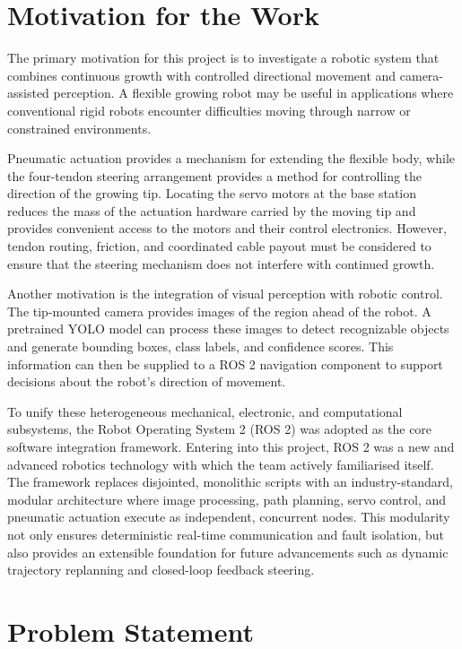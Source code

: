 \section{Motivation for the Work}

The primary motivation for this project is to investigate a robotic system that combines continuous growth with controlled directional movement and camera-assisted perception. A flexible growing robot may be useful in applications where conventional rigid robots encounter difficulties moving through narrow or constrained environments.

Pneumatic actuation provides a mechanism for extending the flexible body, while the four-tendon steering arrangement provides a method for controlling the direction of the growing tip. Locating the servo motors at the base station reduces the mass of the actuation hardware carried by the moving tip and provides convenient access to the motors and their control electronics. However, tendon routing, friction, and coordinated cable payout must be considered to ensure that the steering mechanism does not interfere with continued growth.

Another motivation is the integration of visual perception with robotic control. The tip-mounted camera provides images of the region ahead of the robot. A pretrained YOLO model can process these images to detect recognizable objects and generate bounding boxes, class labels, and confidence scores. This information can then be supplied to a ROS 2 navigation component to support decisions about the robot's direction of movement.

To unify these heterogeneous mechanical, electronic, and computational subsystems, the Robot Operating System 2 (ROS 2) was adopted as the core software integration framework. Entering into this project, ROS 2 was a new and advanced robotics technology with which the team actively familiarised itself. The framework replaces disjointed, monolithic scripts with an industry-standard, modular architecture where image processing, path planning, servo control, and pneumatic actuation execute as independent, concurrent nodes. This modularity not only ensures deterministic real-time communication and fault isolation, but also provides an extensible foundation for future advancements such as dynamic trajectory replanning and closed-loop feedback steering.

\section{Problem Statement}

